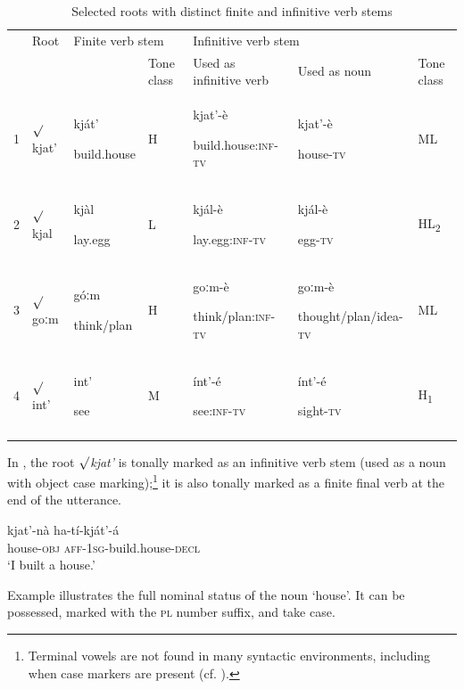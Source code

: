 \documentclass[output=paper]{langsci/langscibook}
\begin{document}
\begin{table}
\caption{Selected roots with distinct finite and infinitive verb stems}
\label{tab:mahland:2}

\begin{tabularx}{\textwidth}{XXXXXXX} & Root & \multicolumn{2}{X}{ Finite verb stem} & \multicolumn{3}{X}{ Infinitive verb stem}\\
\lsptoprule
&  &  & Tone class & Used as infinitive verb & Used as noun\index{Noun} & Tone class\\
1 & ${\surd}$kjat' & kját'

build.house & H & kjat'-è

build.house:\textsc{inf-tv} & kjat'-è

house\textsc{{}-tv} & ML\\
2 & ${\surd}$kjal & kjàl

lay.egg & L & kjál-è

lay.egg\textsc{:inf-tv} & kjál-è

egg\textsc{{}-tv} & HL\textsubscript{2}\\
3 & ${\surd}$goːm & góːm

think/plan & H & goːm-è

think/plan\textsc{:inf-tv} & goːm-è

thought/plan/idea\textsc{{}-tv} & ML\\
4 & ${\surd}$int' & int'

see & M & ínt'-é

see\textsc{:inf-tv} & ínt'-é

sight\textsc{{}-tv} & H\textsubscript{1}\\
\lspbottomrule
\end{tabularx}
\end{table}

In , the root \textit{${\surd}$kjat'} is tonally marked as an infinitive verb stem (used as a noun with object case marking);\footnote{Terminal vowels are not found in many syntactic environments, including when case markers are present (cf. \citealt[313]{Ahland2012}).} it is also tonally marked as a finite final verb at the end of the utterance.  

\ea\label{ex:mahland:16}
\gll kjat'-nà       ha-tí-kját'-{\downstep}á\\
house\textsc{{}-obj}   \textsc{aff-1sg}{}-build.house\textsc{{}-decl} \\
\glt `I built a house.'
\z

Example  illustrates the full nominal status of the noun `house'. It can be possessed, marked with the \textsc{pl} number suffix, and take case. 
\end{document}
